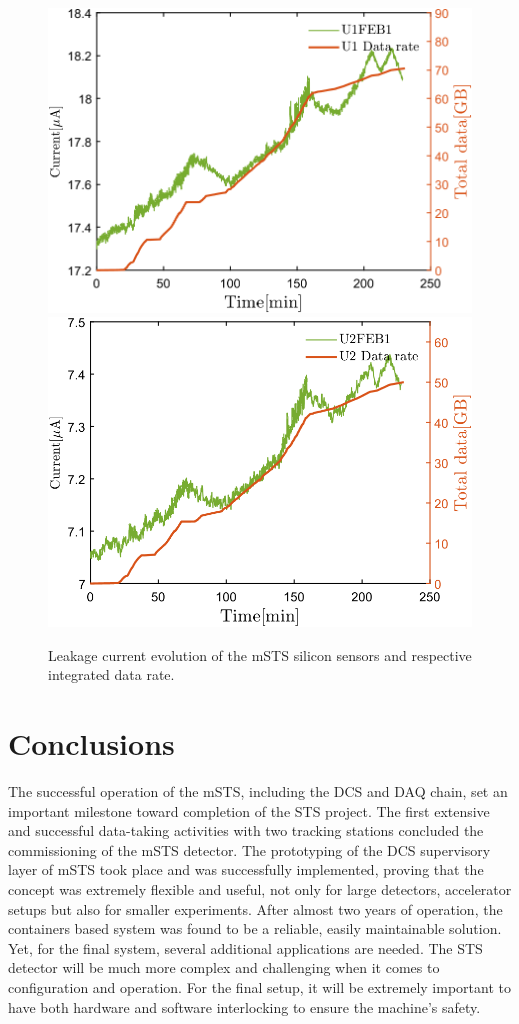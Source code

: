 \begin{figure}[!h]
\centering
\includegraphics[width=0.47\columnwidth]{Chapter6/DCS/images/U1_data_rate.png}
\includegraphics[width=0.47\columnwidth]{Chapter6/DCS/images/U2_data_rate.png}
\caption{Leakage current evolution of the \gls{mSTS} silicon sensors and respective integrated data rate.}
\label{fig_Data}
\end{figure}

\section{Conclusions}

The successful operation of the \gls{mSTS}, including the \gls{DCS} and \gls{DAQ} chain, set an important milestone toward completion of the \gls{STS} project. The first extensive and successful data-taking activities with two tracking stations concluded the commissioning of the \gls{mSTS} detector. The prototyping of the \gls{DCS} supervisory layer of \gls{mSTS} took place and was successfully implemented, proving that the concept was extremely flexible and useful, not only for large detectors, accelerator setups but also for smaller experiments. After almost two years of operation, the containers based system was found to be a reliable, easily maintainable solution. Yet, for the final system, several additional applications are needed. The \gls{STS} detector will be much more complex and challenging when it comes to configuration and operation. For the final setup, it will be extremely important to have both hardware and software interlocking to ensure the machine's safety.

